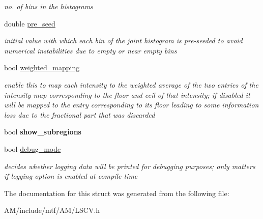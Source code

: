 \begin{DoxyCompactItemize}
\begin{DoxyCompactList}\small\item\em no. of bins in the histograms \end{DoxyCompactList}\item 
\hypertarget{structLSCVParams_affb4225210de6891c0e9674dd973374d}{double \hyperlink{structLSCVParams_affb4225210de6891c0e9674dd973374d}{pre\-\_\-seed}}\label{structLSCVParams_affb4225210de6891c0e9674dd973374d}

\begin{DoxyCompactList}\small\item\em initial value with which each bin of the joint histogram is pre-\/seeded to avoid numerical instabilities due to empty or near empty bins \end{DoxyCompactList}\item 
\hypertarget{structLSCVParams_a6190168b74340ace83845e6473f8ad10}{bool \hyperlink{structLSCVParams_a6190168b74340ace83845e6473f8ad10}{weighted\-\_\-mapping}}\label{structLSCVParams_a6190168b74340ace83845e6473f8ad10}

\begin{DoxyCompactList}\small\item\em enable this to map each intensity to the weighted average of the two entries of the intensity map corresponding to the floor and ceil of that intensity; if disabled it will be mapped to the entry corresponding to its floor leading to some information loss due to the fractional part that was discarded \end{DoxyCompactList}\item 
\hypertarget{structLSCVParams_a5eea66deac51ff69a51552b4725e0320}{bool {\bfseries show\-\_\-subregions}}\label{structLSCVParams_a5eea66deac51ff69a51552b4725e0320}

\item 
\hypertarget{structLSCVParams_a0dee560cd70a046ba749639b72d4f790}{bool \hyperlink{structLSCVParams_a0dee560cd70a046ba749639b72d4f790}{debug\-\_\-mode}}\label{structLSCVParams_a0dee560cd70a046ba749639b72d4f790}

\begin{DoxyCompactList}\small\item\em decides whether logging data will be printed for debugging purposes; only matters if logging option is enabled at compile time \end{DoxyCompactList}\end{DoxyCompactItemize}


The documentation for this struct was generated from the following file\-:\begin{DoxyCompactItemize}
\item 
A\-M/include/mtf/\-A\-M/L\-S\-C\-V.\-h\end{DoxyCompactItemize}
